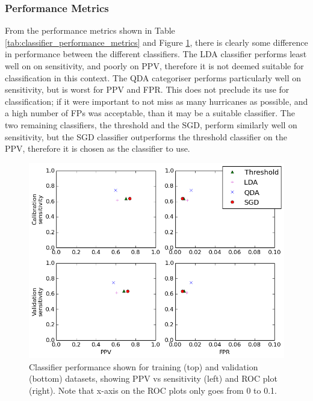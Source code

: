 \documentclass[pdftex,12pt,a4paper]{report}
\begin{document}
\subsubsection{Performance Metrics}

From the performance metrics shown in Table \ref{tab:classifier_performance_metrics} and Figure
\ref{fig:ppv_and_fpr_vs_sens}, there is clearly some difference in performance between the different
classifiers. The LDA classifier performs least well on on sensitivity, and poorly on PPV, therefore
it is not deemed suitable for classification in this context. The QDA categoriser performs
particularly well on sensitivity, but is worst for PPV and FPR. This does not preclude its use for
classification; if it were important to not miss as many hurricanes as possible, and a high number
of FPs was acceptable, than it may be a suitable classifier. The two
remaining classifiers, the threshold and the SGD, perform similarly well on sensitivity, but the SGD
classifier outperforms the threshold classifier on the PPV, therefore it is chosen as the classifier
to use.


\begin{figure}[hb!]
    \centering
    \includegraphics[width=\textwidth]{figures/ppv_and_fpr_vs_sens}
    \caption{Classifier performance shown for training (top) and validation (bottom) datasets,
        showing PPV vs sensitivity (left) and ROC plot (right). Note that x-axis on the ROC plots only
        goes from 0 to 0.1. }
    \label{fig:ppv_and_fpr_vs_sens}
\end{figure}
\end{document}
